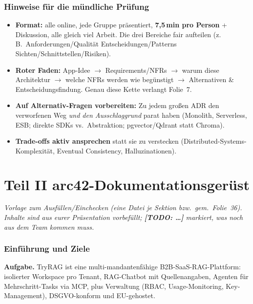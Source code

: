 \documentclass[11pt,a4paper]{article}
\newcommand{\todo}[1]{\textcolor{bad}{\textbf{[TODO: #1]}}}
\begin{document}
\section{Hinweise für die mündliche Prüfung}
\begin{itemize}
  \item \textbf{Format:} alle online, jede Gruppe pr\"asentiert,
        \textbf{7,5\,min pro Person} + Diskussion, alle gleich viel Arbeit. Die
        drei Bereiche fair aufteilen (z.\,B.\ Anforderungen/Qualit\"at \textbar{}
        Entscheidungen/Patterns \textbar{} Sichten/Schnittstellen/Risiken).
  \item \textbf{Roter Faden:} App-Idee $\rightarrow$ Requirements/NFRs $\rightarrow$
        warum diese Architektur $\rightarrow$ welche NFRs werden wie beg\"unstigt
        $\rightarrow$ Alternativen \& Entscheidungsfindung. Genau diese Kette
        verlangt Folie~7.
  \item \textbf{Auf Alternativ-Fragen vorbereiten:} Zu jedem gro{\ss}en ADR den
        verworfenen Weg \emph{und den Ausschlaggrund} parat haben (Monolith,
        Serverless, ESB; direkte SDKs vs.\ Abstraktion; pgvector/Qdrant statt
        Chroma).
  \item \textbf{Trade-offs aktiv ansprechen} statt sie zu verstecken
        (Distributed-Systems-Komplexit\"at, Eventual Consistency, Halluzinationen).
\end{itemize}

\newpage
\part*{Teil II \textendash{} arc42-Dokumentationsger\"ust}
\noindent\emph{Vorlage zum Ausf\"ullen/Einchecken (eine Datei je Sektion bzw.\
gem.\ Folie~36). Inhalte sind aus eurer Pr\"asentation vorbef\"ullt;
\todo{\dots} markiert, was noch aus dem Team kommen muss.}

\section{Einführung und Ziele }
\textbf{Aufgabe.} TryRAG ist eine multi-mandantenf\"ahige B2B-SaaS-RAG-Plattform:
isolierter Workspace pro Tenant, RAG-Chatbot mit Quellenangaben, Agenten f\"ur
Mehrschritt-Tasks via MCP, plus Verwaltung (RBAC, Usage-Monitoring, Key-Management),
DSGVO-konform und EU-gehostet.
\end{document}
